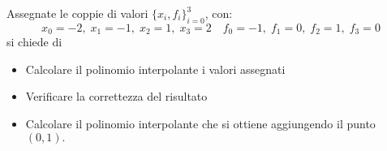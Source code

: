 Assegnate le coppie di valori $\{x_i,f_i \}_{i=0}^3$, con:
\[
x_0=-2, \; x_1=-1, \; x_2=1, \; x_3=2 \quad f_0=-1, \; f_1=0, \;
f_2=1, \; f_3=0
\]
si chiede di
\begin {itemize}
\item Calcolare il polinomio interpolante i valori
assegnati
\item Verificare la correttezza del risultato
\item Calcolare il polinomio interpolante che si ottiene aggiungendo il punto  $(0,1).$
\end{itemize}
